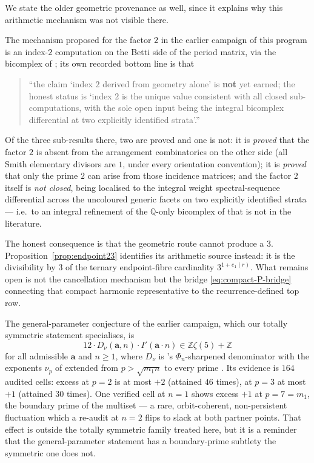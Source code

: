 \documentclass[11pt,reqno]{amsart}
\theoremstyle{plain}
\theoremstyle{definition}
\theoremstyle{remark}
\numberwithin{equation}{section}
\newcommand{\ZZ}{\mathbb{Z}}
\newcommand{\QQ}{\mathbb{Q}}
\begin{document}
We state the older geometric provenance as well, since it explains why this
arithmetic mechanism was not visible there.

The mechanism proposed for the factor $2$ in the earlier campaign of this program is an index-$2$
computation on the Betti side of the period matrix, via the bicomplex of \cite{Du18}; its own
recorded bottom line is that
\begin{quote}
``the claim `index $2$ derived from geometry alone' is \textbf{not} yet earned; the honest status
is `index $2$ is the unique value consistent with all closed sub-computations, with the sole
open input being the integral bicomplex differential at two explicitly identified strata'.''
\end{quote}
Of the three sub-results there, two are proved and one is not: it is \emph{proved} that the
factor $2$ is absent from the arrangement combinatorics on the other side (all Smith elementary
divisors are $1$, under every orientation convention); it is \emph{proved} that only the prime
$2$ can arise from those incidence matrices; and the factor $2$ itself is \emph{not closed},
being localised to the integral weight spectral-sequence differential across the uncoloured
generic facets on two explicitly identified strata --- i.e.\ to an integral refinement of the
$\QQ$-only bicomplex of \cite{Du18} that is not in the literature.

The honest consequence is that the geometric route cannot produce a $3$.
Proposition~\ref{prop:endpoint23} identifies its arithmetic source instead: it is the
divisibility by $3$ of the ternary endpoint-fibre cardinality
$3^{1+e_1(r)}$.  What remains open is not the cancellation mechanism but the bridge
\eqref{eq:compact-P-bridge} connecting that compact harmonic representative to the
recurrence-defined top row.

The general-parameter conjecture of the earlier campaign, which our totally symmetric statement
specialises, is
\[
12\cdot D_\nu(\boldsymbol a,n)\cdot I'(\boldsymbol a\cdot n)\in\ZZ\zeta(5)+\ZZ
\]
for all admissible $\boldsymbol a$ and $n\ge1$, where $D_\nu$ is \cite{BZ}'s $\Phi_n$-sharpened
denominator with the exponents $\nu_p$ of \cite[(nu\_p)]{BZ} extended from $p>\sqrt{m_1n}$ to
every prime \cite{ProgCONJ}. Its evidence is $164$ audited cells: excess at $p=2$ is at
most $+2$ (attained $46$ times), at $p=3$ at most $+1$ (attained $30$ times). One verified cell
at $n=1$ shows excess $+1$ at $p=7=m_1$, the boundary prime of the multiset --- a rare,
orbit-coherent, non-persistent fluctuation which a re-audit at $n=2$ flips to slack at both
partner points. That effect is outside the totally symmetric family treated here, but it is a
reminder that the general-parameter statement has a boundary-prime subtlety the symmetric one
does not.
\end{document}
